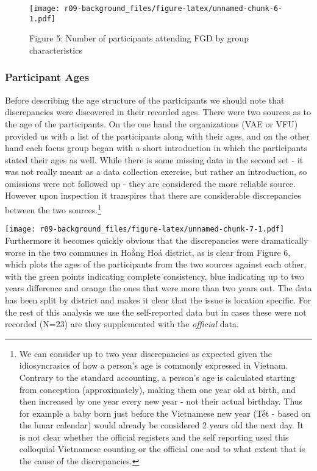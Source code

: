 \documentclass[]{article}
\let\rmarkdownfootnote\footnote%
\def\footnote{\protect\rmarkdownfootnote}
\begin{document}
\begin{figure}
\centering
\texttt{[image: r09-background\_files/figure-latex/unnamed-chunk-6-1.pdf]}
\caption{Figure 5: Number of participants attending FGD by group
characteristics}
\end{figure}

\hypertarget{participant-ages}{%
\subsubsection{Participant Ages}\label{participant-ages}}

Before describing the age structure of the participants we should note
that discrepancies were discovered in their recorded ages. There were
two sources as to the age of the participants. On the one hand the
organizations (VAE or VFU) provided us with a list of the participants
along with their ages, and on the other hand each focus group began with
a short introduction in which the participants stated their ages as
well. While there is some missing data in the second set - it was not
really meant as a data collection exercise, but rather an introduction,
so omissions were not followed up - they are considered the more
reliable source. However upon inspection it transpires that there are
considerable discrepancies between the two sources.\footnote{We can
  consider up to two year discrepancies as expected given the
  idiosyncrasies of how a person's age is commonly expressed in Vietnam.
  Contrary to the standard accounting, a person's age is calculated
  starting from conception (approximately), making them one year old at
  birth, and then increased by one year every new year - not their
  actual birthday. Thus for example a baby born just before the
  Vietnamese new year (Tết - based on the lunar calendar) would already
  be considered 2 years old the next day. It is not clear whether the
  official registers and the self reporting used this colloquial
  Vietnamese counting or the official one and to what extent that is the
  cause of the discrepancies.}

\texttt{[image: r09-background\_files/figure-latex/unnamed-chunk-7-1.pdf]}
Furthermore it becomes quickly obvious that the discrepancies were
dramatically worse in the two communes in Hoằng Hoá district, as is
clear from Figure 6, which plots the ages of the participants from the
two sources against each other, with the green points indicating
complete consistency, blue indicating up to two years difference and
orange the ones that were more than two years out. The data has been
split by district and makes it clear that the issue is location
specific. For the rest of this analysis we use the self-reported data
but in cases these were not recorded (N=23) are they supplemented with
the \emph{official} data.
\end{document}
